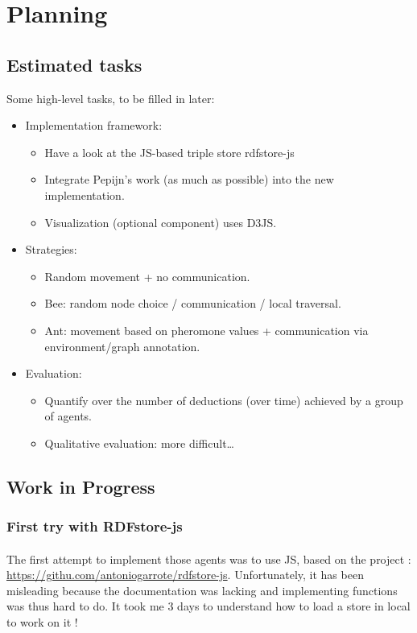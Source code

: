 \documentclass{article}
\newenvironment{itemh}[0]{\begin{itemize}[label=$\heartsuit$, font=\color{mygray} \small]}{\end{itemize}}
\newenvironment{itemH}[0]{\begin{itemize}[label=$\heartsuit$, font=\color{mygray} \large]}{\end{itemize}}
\begin{document}
\newpage
\section{Planning}
	\subsection{Estimated tasks}
		Some high-level tasks, to be filled in later:
		\begin{itemH}
			\item Implementation framework:
				\begin{itemh}
					\item Have a look at the JS-based triple store rdfstore-js
					\item Integrate Pepijn’s work (as much as possible)  into the new implementation.
					\item Visualization (optional component) uses D3JS.
				\end{itemh}
			\item Strategies:
				\begin{itemh}
					\item Random movement + no communication.
					\item Bee: random node choice / communication / local traversal.
					\item Ant: movement based on pheromone values + communication via environment/graph annotation.
				\end{itemh}
			\item Evaluation:
				\begin{itemh}
					\item Quantify over the number of deductions (over time) achieved by a group of agents.
					\item Qualitative evaluation: more difficult…
				\end{itemh}
		\end{itemH}
	\subsection{Work in Progress}
		\subsubsection{First try with RDFstore-js}
			\paragraph{} The first attempt to implement those agents was to use JS, based on the project :
			\url{https://githu.com/antoniogarrote/rdfstore-js}.
			Unfortunately, it has been misleading because the documentation was lacking
			and implementing functions was thus hard to do.
			It took me 3 days to understand how to load a store in local to work on it !
\end{document}
